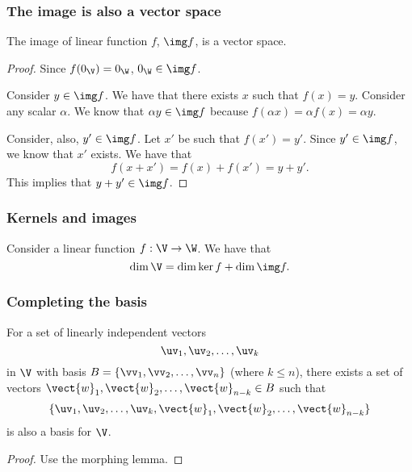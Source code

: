 \begin{frame}
\frametitle{The image is also a vector space}

\begin{lemma}
  The image of linear function $f$, $\img f$, is a vector space.
\end{lemma}
\begin{proof}
  \pause
  Since $f(0_\V)=0_\W$, $0_\W\in\img f$.

  \pause
  Consider $y\in\img f$. We have that there exists $x$ such that
  $f(x)=y$.  Consider any scalar $\alpha$.  We know that $\alpha
  y\in\img f$ because $f(\alpha x) = \alpha f(x) =\alpha y$.

  \pause
  Consider, also, $y'\in\img f$.  Let $x'$ be such that $f(x')=y'$.
  Since $y'\in\img f$, we know that $x'$ exists.  We have that
  \[
  f(x+x')=f(x)+f(x')=y+y'.
  \]
  This implies that $y+y'\in\img f$.
\end{proof}
\end{frame}

\begin{frame}
\frametitle{Kernels and images}

\begin{theorem}
  Consider a linear function $f:\V\rightarrow\W$.  We have that
  \[
  \dim \V = \dim\ker f + \dim\img f.
  \]
\end{theorem}
\end{frame}

\begin{frame}
  \frametitle{Completing the basis}
  
  \begin{lemma}
    For a set of linearly independent vectors
    \[
    \uv_1,\uv_2,\ldots,\uv_k
    \]
    in $\V$ with basis $B=\{\vv_1,\vv_2,\ldots,\vv_n\}$
    (where $k\leq n$), there exists a set of vectors
    $\vect{w}_1,\vect{w}_2,\ldots,\vect{w}_{n-k}\in B$ such
    that
    \[
    \{
    \uv_1,\uv_2,\ldots,\uv_k,
    \vect{w}_1,\vect{w}_2,\ldots,\vect{w}_{n-k}
    \}
    \]
    is also a basis for $\V$.
  \end{lemma}

  \pause

  \begin{proof}
    Use the morphing lemma.
  \end{proof}
\end{frame}

